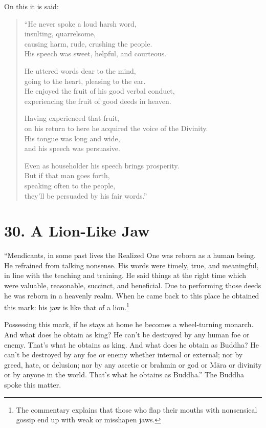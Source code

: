 \documentclass[12pt,openany]{book}%
\begin{document}
On this it is said: 

\begin{verse}%
“He never spoke a loud harsh word, \\
insulting, quarrelsome, \\
causing harm, rude, crushing the people. \\
His speech was sweet, helpful, and courteous. 

He uttered words dear to the mind, \\
going to the heart, pleasing to the ear. \\
He enjoyed the fruit of his good verbal conduct, \\
experiencing the fruit of good deeds in heaven. 

Having experienced that fruit, \\
on his return to here he acquired the voice of the Divinity. \\
His tongue was long and wide, \\
and his speech was persuasive. 

Even as householder his speech brings prosperity. \\
But if that man goes forth, \\
speaking often to the people, \\
they’ll be persuaded by his fair words.” 

%
\end{verse}

\section*{30. A Lion-Like Jaw }

“Mendicants, in some past lives the Realized One was reborn as a human being. He refrained from talking nonsense. His words were timely, true, and meaningful, in line with the teaching and training. He said things at the right time which were valuable, reasonable, succinct, and beneficial. Due to performing those deeds he was reborn in a heavenly realm. When he came back to this place he obtained this mark: his jaw is like that of a lion.\footnote{The commentary explains that those who flap their mouths with nonsensical gossip end up with weak or misshapen jaws. } 

Possessing this mark, if he stays at home he becomes a wheel-turning monarch. And what does he obtain as king? He can’t be destroyed by any human foe or enemy. That’s what he obtains as king. And what does he obtain as Buddha? He can’t be destroyed by any foe or enemy whether internal or external; nor by greed, hate, or delusion; nor by any ascetic or brahmin or god or \textsanskrit{Māra} or divinity or by anyone in the world. That’s what he obtains as Buddha.” The Buddha spoke this matter. 
\end{document}
